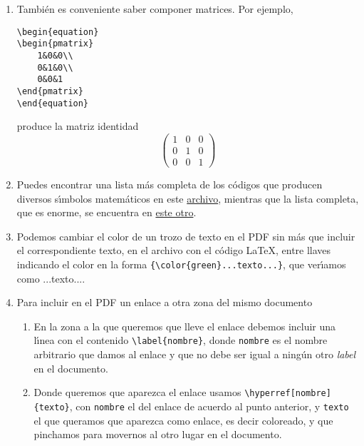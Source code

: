 \begin{appendices}
\begin{enumerate}
\begin{enumerate}
\end{enumerate}
\item Tambi\'en es conveniente saber componer matrices. Por ejemplo, 

\begin{lstlisting}[language={[LaTeX]TeX}]
\begin{equation}
\begin{pmatrix}
    1&0&0\\
    0&1&0\\
    0&0&1
\end{pmatrix}
\end{equation}
\end{lstlisting}
\noindent produce la matriz identidad 
\begin{equation}
\begin{pmatrix}
    1&0&0\\
    0&1&0\\
    0&0&1
\end{pmatrix}
\end{equation}
\item Puedes encontrar una lista m\'as completa de los c\'odigos que producen
diversos s\'{\i}mbolos matem\'aticos en este
\href{http://150.244.21.37/PDFs/INTRO/short-math-guide.pdf}{archivo}, mientras que la lista
completa, que es enorme, se encuentra en
\href{http://150.244.21.37/PDFs/INTRO/symbols-a4.pdf}{este otro}.
\item Podemos cambiar el color de un trozo de texto en el PDF sin m\'as que
incluir el correspondiente texto, en el archivo con el c\'odigo \LaTeX,  entre
llaves indicando el color en la forma
{\tt\lstinline[language={[LaTeX]TeX}]|{\color{green}...texto...}|}, %
que ver\'{\i}amos como {\color{green}...texto...}. 



\item Para incluir en el PDF un enlace a otra zona del mismo documento 
\begin{enumerate}
 \item En la zona a la que queremos que lleve el enlace debemos incluir una
l\'{\i}nea con el contenido 
 \verb=\label{nombre}=, donde {\tt nombre} es el nombre arbitrario que damos al
enlace y que no debe ser igual a ning\'un otro  {\itshape label} en el
documento.
 \item Donde queremos que aparezca el enlace usamos
\verb|\hyperref[nombre]{texto}|, con {\tt nombre} el del enlace de acuerdo al
punto
anterior, y {\tt texto} el que queramos que aparezca como enlace, es decir
coloreado, y que pinchamos para movernos al otro lugar en el documento.
 \end{enumerate}


\end{enumerate}
\end{appendices}
